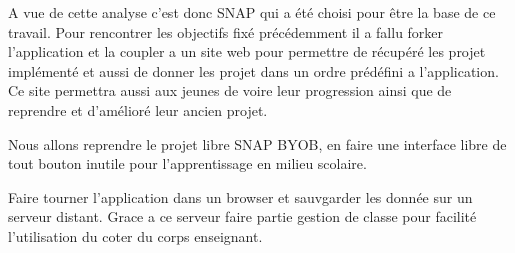 A vue de cette analyse c'est donc SNAP qui a été choisi pour être la base de ce travail. Pour rencontrer les objectifs fixé précédemment il a fallu forker l'application et la coupler a un site web pour permettre de récupéré les projet implémenté et aussi de donner les projet dans un ordre prédéfini a l'application. Ce site permettra aussi aux jeunes de voire leur progression ainsi que de reprendre et d'amélioré leur ancien projet.

Nous allons reprendre le projet libre SNAP BYOB, en faire une interface libre de tout bouton inutile pour l'apprentissage en milieu scolaire. 

Faire tourner l'application dans un browser et sauvgarder les donnée sur un serveur distant. Grace a ce serveur faire partie gestion de classe pour facilité l'utilisation du coter du corps enseignant.
